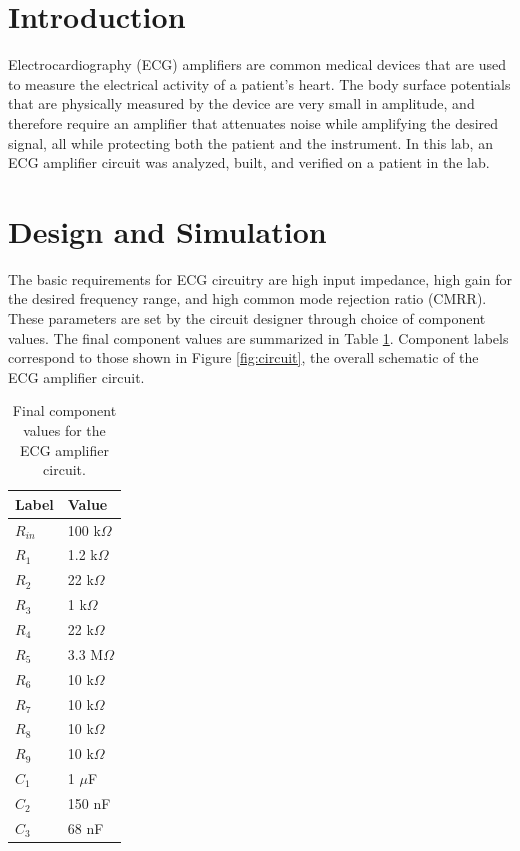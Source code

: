 \documentclass[pdftex,12pt,letterpaper]{article}
\begin{document}
\section{Introduction}

Electrocardiography (ECG) amplifiers are common  medical devices that are used to measure the electrical activity of a patient's heart. The body surface potentials that are physically measured by the device are very small in amplitude, and therefore require an amplifier that attenuates noise while amplifying the desired signal, all while protecting both the patient and the instrument. In this lab, an ECG amplifier circuit was analyzed, built, and verified on a patient in the lab.

\section{Design and Simulation}

The basic requirements for ECG circuitry are high input impedance, high gain for the desired frequency range, and high common mode rejection ratio (CMRR). These parameters are set by the circuit designer through choice of component values. The final component values are summarized in Table \ref{table:values}. Component labels correspond to those shown in Figure \ref{fig:circuit},  the overall schematic of the ECG amplifier circuit.


\begin{table}[H]
\begin{center}
    \begin{tabular}{ | l | l | }
    \hline
    Label & Value \\ \hline
    $R_{in}$ & 100 k$\Omega$ \\ \hline
    $R_1$ & 1.2 k$\Omega$ \\ \hline
    $R_2$ & 22 k$\Omega$  \\ \hline
    $R_3$ & 1 k$\Omega$  \\ \hline
    $R_4$ & 22 k$\Omega$ \\ \hline
    $R_5$ & 3.3 M$\Omega$  \\ \hline
    $R_6$ & 10 k$\Omega$  \\ \hline
    $R_7$ & 10 k$\Omega$ \\ \hline
    $R_8$ & 10 k$\Omega$  \\ \hline
    $R_9$ & 10 k$\Omega$  \\ \hline
    $C_1$ & 1 $\mu$F \\ \hline
    $C_2$ & 150 nF  \\ \hline
    $C_3$ & 68 nF  \\
    \hline
    \end{tabular}
    \caption{Final component values for the ECG amplifier circuit.}
    \label{table:values}
\end{center}
\end{table}
\end{document}
